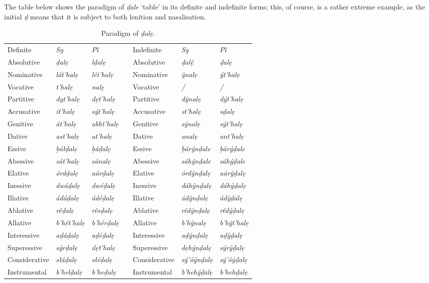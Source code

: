 \documentclass[a4paper, 12pt, twoside, final]{article}
\let \nf \normalfont
\let \w \textit
\begin{document}
\noindent The table below shows the paradigm of \w{ḍale} ‘table’ in its definite and indefinite forms; this, of course,
is a rather extreme example, as the initial \w{ḍ} means that it is subject to both lenition and nasalisation.

\begin{table}[H]
\centering
\noindent\begin{tabular}{l|>{\it}l|>{\it}lll|>{\it}l|>{\it}l}
Definite    &\nf Sg&\nf Pl && Indefinite&\nf Sg&\nf Pl\\\cline{1-3}\cline{5-7}

Absolutive    & ḍalẹ        & lḍalẹ      && Absolutive    & ḍalẹ́       & ḍalẹ       \\
Nominative    & lát’halẹ    & lét’halẹ   && Nominative    & ŷnalẹ      & ýt’halẹ    \\
Vocative      & t’halẹ      & nalẹ       && Vocative      & /          & /          \\
Partitive     & dyt’halẹ    & dẹt’halẹ   && Partitive     & dŷnalẹ     & dýt’halẹ   \\
Accusative    & it’halẹ     & sýt’halẹ   && Accusative    & st’halẹ    & sḍalẹ      \\
Genitive      & át’halẹ     & abht’halẹ  && Genitive      & sýnalẹ     & sýt’halẹ   \\
Dative        & ast’halẹ    & at’halẹ    && Dative        & analẹ      & ant’halẹ   \\
Essive        & ḅáłḍalẹ     & ḅáḍalẹ     && Essive        & ḅárýnḍale  & ḅárýḍale   \\
Abessive      & sát’halẹ    & sánalẹ     && Abessive      & sáhýnḍale  & sáhýḍale   \\
Elative       & órdḍalẹ     & aúrḍalẹ    && Elative       & órdŷnḍalẹ  & aúrŷḍalẹ   \\
Inessive      & dwáḍalẹ     & dwéḍalẹ    && Inessive      & dáhŷnḍalẹ  & dáhŷḍalẹ   \\
Illative      & ádáḍalẹ     & ádéḍalẹ    && Illative      & ádŷnḍalẹ   & ádŷḍalẹ    \\
Ablative      & rêḍalẹ      & rêsḍalẹ    && Ablative      & rêdýnḍalẹ  & rêdýḍalẹ   \\
Allative      & b’hét’halẹ  & b’hérḍalẹ  && Allative      & b’hŷnalẹ   & b’hýt’halẹ \\
Interessive   & aḍáḍalẹ     & aḍéḍalẹ    && Interessive   & aḍŷnḍalẹ   & aḍŷḍalẹ    \\
Superessive   & sýrḍalẹ     & dẹt’halẹ   && Superessive   & dẹhýnḍalẹ  & sýrŷḍalẹ   \\
Considerative & słáḍalẹ     & słéḍalẹ    && Considerative & sý’óýnḍalẹ & sý’óýḍalẹ  \\
Instrumental  & b’helḍalẹ   & b’heḍalẹ   && Instrumental  & b’hehýḍalẹ & b’hehḍalẹ  \\
\end{tabular}
\caption{Paradigm of \w{ḍalẹ}.}\label{tab:vocalic-declension}
\end{table}
\end{document}
